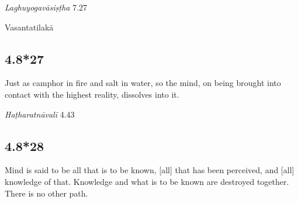 \begin{ekdosis}
\begin{sources}[hp04_008_26]
\emph{Laghuyogavāsiṣṭha} 7.27
\begin{versinnote}
\end{versinnote}
\end{sources}



\begin{metre}[hp04_008_26]
Vasantatilakā
\end{metre}

\subsection*{4.8*27}
\begin{translation}[hp04_008_27]
Just as camphor in fire and salt in water, so the mind, on being brought into contact with the highest reality, dissolves into it.
\end{translation}


\begin{testimonia}[hp04_008_27]
\emph{Haṭharatnāvalī} 4.43
\begin{versinnote}
\end{versinnote}
\end{testimonia}


\subsection*{4.8*28}
\begin{translation}[hp04_008_28]
Mind is said to be all that is to be known, [all] that has been perceived, and [all] knowledge of that. Knowledge and what is to be known are destroyed together. There is no other path.
\end{translation}


\end{ekdosis}
